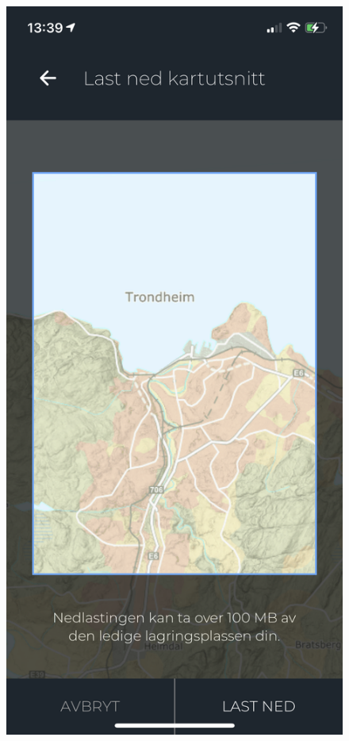 \begin{figure}[H]
  \centering
  \begin{minipage}[b]{0.4\textwidth}
    \centering
    \includegraphics[scale=0.4]{Figurer/skjermbilder/last-ned-nytt-kartutsnitt.png}

\end{minipage}
\end{figure}
